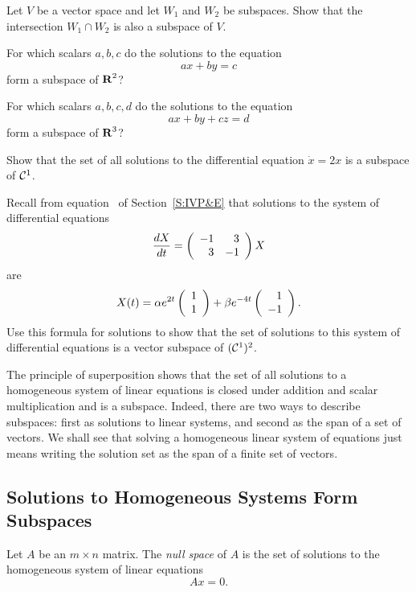 \begin{exercise} \label{c5.1.6}
Let $V$ be a vector space and let $W_1$ and $W_2$ be subspaces.
Show that the intersection $W_1\cap W_2$ is also a subspace of $V$.
\end{exercise}

\begin{exercise} \label{c5.1.7a}
For which scalars $a,b,c$ do the solutions to the equation
\[
ax+by = c
\]
form a subspace of $\mbox{$\bf{R}$}^2$?
\end{exercise}
\begin{exercise} \label{c5.1.7b}
For which scalars $a,b,c,d$ do the solutions to the equation
\[
ax+by+cz = d
\]
form a subspace of $\mbox{$\bf{R}$}^3$?
\end{exercise}

\begin{exercise} \label{c5.1.8}
Show that the set of all solutions to the differential equation
$\dot{x}=2x$ is a subspace of ${\cal C}^1$.
\end{exercise}

\begin{exercise} \label{c5.1.9}
Recall from equation~ of Section~\ref{S:IVP&E}
that solutions to the system of differential equations
\[
\frac{dX}{dt} = \left(\begin{array}{rr} -1 & 3\\ 3 &-1\end{array}\right) X
\]
are
\[
X(t) = \alpha e^{2t}\left(\begin{array}{r} 1 \\ 1\end{array}\right) + \beta e^{-4t}\left(\begin{array}{r} 1 \\ -1\end{array}\right).
\]
Use this formula for solutions to show that the set of solutions
to this system of differential equations is a vector subspace of
$({\cal C}^1)^2$.
\end{exercise}

 \label{S:5.2}

The principle of superposition shows that the set of all
solutions to a homogeneous system of linear equations is closed under 
addition and scalar multiplication and is a
subspace.  Indeed, there are two ways to describe subspaces:
first as solutions to linear systems, and second as the span of
a set of vectors.  We shall see that solving a homogeneous linear system of
equations just means writing the solution set as the span of a
finite set of vectors.

\subsection*{Solutions to Homogeneous Systems Form Subspaces}
 

\begin{Def} \label{D:nullspace}
Let $A$ be an $m\times n$ matrix.  The {\em null space\/} of $A$
is the set of solutions to the homogeneous system of linear equations
\begin{equation} \label{Ax=0}
Ax=0.
\end{equation}
\end{Def} 

